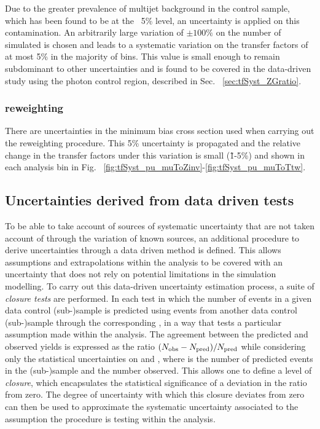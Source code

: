 Due to the greater prevalence of \QCD multijet background in the \gj
control sample, which has been found to be at the ~5\% level, an
uncertainty is applied on this contamination. An arbitrarily large
variation of $\pm 100\%$ on the number of simulated \QCD is chosen and
leads to a systematic variation on the transfer factors of at most 5\%
in the majority of bins. This value is small enough to remain
subdominant to other uncertainties and is found to be covered in the
data-driven study using the photon control region, described in Sec.
~\ref{sec:tfSyst_ZGratio}.

\subsubsection*{\PU reweighting}
\label{sec:tfSyst_pu}

There are uncertainties in the minimum bias cross section used when
carrying out the \PU reweighting procedure.  This 5\% uncertainty is
propagated and the relative change in the transfer factors under this
variation is small (\~1-5\%) and shown in each analysis bin in Fig.
~\ref{fig:tfSyst_pu_muToZinv}-\ref{fig:tfSyst_pu_muToTtw}.

\subsection{Uncertainties derived from data driven tests}
\label{sec:closureTests}

To be able to take account of sources of systematic uncertainty that
are not taken account of through the variation of known sources, an
additional procedure to derive uncertainties through a data driven
method is defined.  This allows assumptions and extrapolations
within the analysis to be covered with an uncertainty that does not
rely on potential limitations in the simulation modelling. To carry
out this data-driven uncertainty estimation process, a suite of
\emph{closure tests} are performed. In each test in which the number
of events in a given data control (sub-)sample is predicted using
events from another data control (sub-)sample through the
corresponding \TF, in a way that tests a particular assumption made
within the analysis.  The agreement between the predicted and observed
yields is expressed as the ratio $(N_{\textrm{obs}} - N_{\textrm{pred}})/N_{\textrm{pred}}$ while
considering only the statistical uncertainties on \npre and \nobs,
where \npre is the number of predicted events in the (sub-)sample and
\nobs the number observed.  This allows one to define a level of
\emph{closure}, which encapsulates the statistical significance of a
deviation in the ratio from zero. The degree of uncertainty with which
this closure deviates from zero can then be used to approximate the
systematic uncertainty associated to the assumption the procedure is
testing within the analysis.


